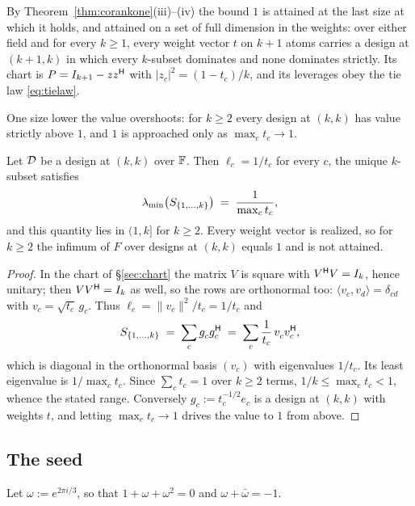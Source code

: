 By Theorem~\ref{thm:corankone}(iii)--(iv) the bound $1$ is attained at
the last size at which it holds, and attained on a set of full dimension
in the weights: over either field and for every $k\ge1$, every weight
vector $t$ on $k+1$ atoms carries a design at $(k+1,k)$ in which every
$k$-subset dominates and none dominates strictly.  Its chart is
$P=I_{k+1}-zz^{\mathsf{H}}$ with
$\lvert z_c\rvert^{2}=(1-t_c)/k$, and its leverages obey the tie law
\eqref{eq:tielaw}.

One size lower the value overshoots: for $k\ge2$ every design at $(k,k)$
has value strictly above $1$, and $1$ is approached only as
$\max_c t_c\to1$.

\begin{proposition}\label{prop:square}
Let $\mathcal{D}$ be a design at $(k,k)$ over $\mathbb{F}$.  Then $\ell_c=1/t_c$ for every
$c$, the unique $k$-subset satisfies
\[
  \lambda_{\min}\bigl(S_{\{1,\dots,k\}}\bigr)\;=\;\frac{1}{\max_c t_c},
\]
and this quantity lies in $(1,k]$ for $k\ge2$.  Every weight vector is
realized, so for $k\ge2$ the infimum of $F$ over designs
at $(k,k)$ equals $1$ and is not attained.
\end{proposition}

\begin{proof}
In the chart of \S\ref{sec:chart} the matrix $V$ is square with
$V^{\mathsf{H}} V=I_k$, hence unitary; then $VV^{\mathsf{H}}=I_k$ as well, so the rows are
orthonormal too:
$\langle v_c,v_d\rangle=\delta_{cd}$ with $v_c=\sqrt{t_c}\,g_c$.  Thus
$\ell_c=\lVert v_c\rVert^2/t_c=1/t_c$ and
\[
  S_{\{1,\dots,k\}}\;=\;\sum_c g_c^{\vphantom{\mathsf{H}}}g_c\adj
  \;=\;\sum_c \frac{1}{t_c}\,v_c^{\vphantom{\mathsf{H}}}v_c\adj,
\]
which is diagonal in the orthonormal basis $(v_c)$ with eigenvalues
$1/t_c$.  Its least eigenvalue is $1/\max_c t_c$.  Since $\sum_c t_c=1$
over $k\ge2$ terms, $1/k\le\max_c t_c<1$, whence the stated range.
Conversely $g_c:=t_c^{-1/2}e_c$ is a design at $(k,k)$ with weights $t$,
and letting $\max_c t_c\to1$ drives the value to $1$ from above.
\end{proof}

\subsection{The seed}\label{sec:cseed}

Let
$\omega:=e^{2\pi i/3}$, so that $1+\omega+\omega^{2}=0$ and
$\omega+\bar\omega=-1$.

